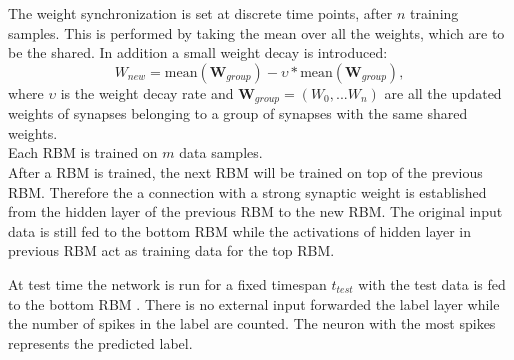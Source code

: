 The weight synchronization is set at discrete time points, after $n$ training samples.
This is performed by taking the mean over all the weights, which are to be the shared.
In addition a small weight decay is introduced:
\[
W_{new} = \text{mean}(\textbf{W}_{group}) - \upsilon * \text{mean}(\textbf{W}_{group}) , 
\]
where $\upsilon$ is the weight decay rate and $\textbf{W}_{group} = (W_0 ,... W_n)$ are all the updated weights of synapses belonging to a group of synapses with the same shared weights.
\\
Each RBM is trained on $m$ data samples.
\\
After a RBM is trained, the next RBM will be trained on top of the previous RBM.
Therefore the a connection with a strong synaptic weight is established from the hidden layer of the previous RBM to the new RBM.
The original input data is still fed to the bottom RBM while the activations of hidden layer in previous RBM act as training data for the top RBM.


At test time the network is run for a fixed timespan $t_{test}$ with the test data is fed to the bottom RBM .
There is no external input forwarded the label layer while the number of spikes in the label are counted.
The neuron with the most spikes represents the predicted label.  

 